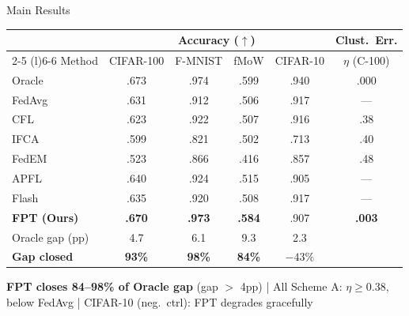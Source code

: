 \documentclass[aspectratio=169,11pt]{beamer}
\begin{document}
\begin{frame}{Main Results}

\centering
{\small
\setlength{\tabcolsep}{5pt}
\begin{tabular}{@{}l cccc c@{}}
\toprule
& \multicolumn{4}{c}{\textbf{Accuracy} ($\uparrow$)} & \textbf{Clust.~Err.} \\
\cmidrule(lr){2-5} \cmidrule(l){6-6}
Method & CIFAR-100 & F-MNIST & fMoW & CIFAR-10 & $\eta$ (C-100) \\
\midrule
\textcolor{cOracle}{Oracle} & .673 & .974 & .599 & .940 & .000 \\
FedAvg & .631 & .912 & .506 & .917 & --- \\
\midrule
\textcolor{cA}{CFL} & .623 & .922 & .507 & .916 & \textcolor{cA}{.38} \\
\textcolor{cA}{IFCA} & .599 & .821 & .502 & .713 & \textcolor{cA}{.40} \\
\textcolor{cA}{FedEM} & .523 & .866 & .416 & .857 & \textcolor{cA}{.48} \\
\midrule
APFL & .640 & .924 & .515 & .905 & --- \\
Flash & .635 & .920 & .508 & .917 & --- \\
\midrule
\textcolor{cC}{\textbf{FPT (Ours)}} & \textcolor{cC}{\textbf{.670}} & \textcolor{cC}{\textbf{.973}} & \textcolor{cC}{\textbf{.584}} & .907 & \textcolor{cC}{\textbf{.003}} \\
\midrule
Oracle gap (pp) & 4.7 & 6.1 & 9.3 & 2.3 & \\
\textbf{Gap closed} & \textbf{93\%} & \textbf{98\%} & \textbf{84\%} & $-43\%$ & \\
\bottomrule
\end{tabular}
}

\vspace{2pt}
{\small
\textcolor{cC}{\textbf{FPT closes 84--98\% of Oracle gap}} (gap $>$ 4pp) \quad|\quad
\textcolor{cA}{All Scheme A: $\eta \geq 0.38$, below FedAvg} \quad|\quad
CIFAR-10 (neg.~ctrl): FPT degrades gracefully
}
\end{frame}
\end{document}
